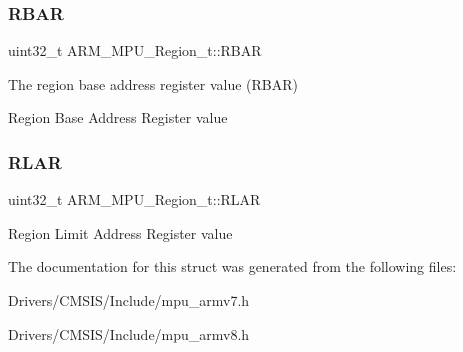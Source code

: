 \subsubsection{\texorpdfstring{R\+B\+AR}{RBAR}}
{\footnotesize\ttfamily uint32\+\_\+t A\+R\+M\+\_\+\+M\+P\+U\+\_\+\+Region\+\_\+t\+::\+R\+B\+AR}



The region base address register value (R\+B\+AR) 

Region Base Address Register value \mbox{\label{struct_a_r_m___m_p_u___region__t_ab5d3a650dbffd0b272bf7df5b140e8a8}} 
\subsubsection{\texorpdfstring{R\+L\+AR}{RLAR}}
{\footnotesize\ttfamily uint32\+\_\+t A\+R\+M\+\_\+\+M\+P\+U\+\_\+\+Region\+\_\+t\+::\+R\+L\+AR}

Region Limit Address Register value 

The documentation for this struct was generated from the following files\+:\begin{DoxyCompactItemize}
\item 
Drivers/\+C\+M\+S\+I\+S/\+Include/mpu\+\_\+armv7.\+h\item 
Drivers/\+C\+M\+S\+I\+S/\+Include/mpu\+\_\+armv8.\+h\end{DoxyCompactItemize}
